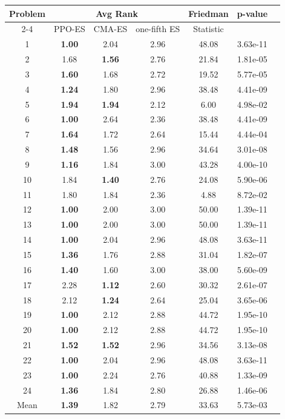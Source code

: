 
        \begin{tabular}{ccccccc}
        \toprule
        \multirow{2}{*}{Problem} & \multicolumn{3}{c}{Avg Rank} & Friedman & \multirow{2}{*}{p-value} \\
        \cline{2-4}
        & PPO-ES & CMA-ES & one-fifth ES & Statistic & \\
        \midrule
        1 & \textbf{1.00} & 2.04 & 2.96 & 48.08 & 3.63e-11 \\
2 & 1.68 & \textbf{1.56} & 2.76 & 21.84 & 1.81e-05 \\
3 & \textbf{1.60} & 1.68 & 2.72 & 19.52 & 5.77e-05 \\
4 & \textbf{1.24} & 1.80 & 2.96 & 38.48 & 4.41e-09 \\
5 & \textbf{1.94} & \textbf{1.94} & 2.12 & 6.00 & 4.98e-02 \\
6 & \textbf{1.00} & 2.64 & 2.36 & 38.48 & 4.41e-09 \\
7 & \textbf{1.64} & 1.72 & 2.64 & 15.44 & 4.44e-04 \\
8 & \textbf{1.48} & 1.56 & 2.96 & 34.64 & 3.01e-08 \\
9 & \textbf{1.16} & 1.84 & 3.00 & 43.28 & 4.00e-10 \\
10 & 1.84 & \textbf{1.40} & 2.76 & 24.08 & 5.90e-06 \\
11 & 1.80 & 1.84 & 2.36 & 4.88 & 8.72e-02 \\
12 & \textbf{1.00} & 2.00 & 3.00 & 50.00 & 1.39e-11 \\
13 & \textbf{1.00} & 2.00 & 3.00 & 50.00 & 1.39e-11 \\
14 & \textbf{1.00} & 2.04 & 2.96 & 48.08 & 3.63e-11 \\
15 & \textbf{1.36} & 1.76 & 2.88 & 31.04 & 1.82e-07 \\
16 & \textbf{1.40} & 1.60 & 3.00 & 38.00 & 5.60e-09 \\
17 & 2.28 & \textbf{1.12} & 2.60 & 30.32 & 2.61e-07 \\
18 & 2.12 & \textbf{1.24} & 2.64 & 25.04 & 3.65e-06 \\
19 & \textbf{1.00} & 2.12 & 2.88 & 44.72 & 1.95e-10 \\
20 & \textbf{1.00} & 2.12 & 2.88 & 44.72 & 1.95e-10 \\
21 & \textbf{1.52} & \textbf{1.52} & 2.96 & 34.56 & 3.13e-08 \\
22 & \textbf{1.00} & 2.04 & 2.96 & 48.08 & 3.63e-11 \\
23 & \textbf{1.00} & 2.24 & 2.76 & 40.88 & 1.33e-09 \\
24 & \textbf{1.36} & 1.84 & 2.80 & 26.88 & 1.46e-06 \\
\midrule
Mean & \textbf{1.39} & 1.82 & 2.79 & 33.63 & 5.73e-03 \\
\bottomrule
\end{tabular}